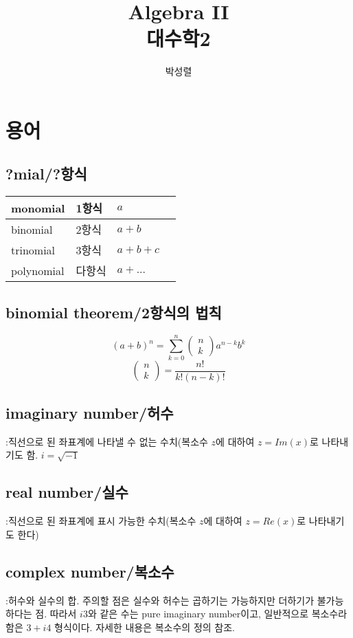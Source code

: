 \documentclass{article}
\title{Algebra II \\대수학2}
\author{박성렬}
\begin{document}
\maketitle

\section{용어}
\subsection{?mial/?항식}
\begin{tabular} {| l | l | l | l |}
\hline
monomial & 1항식 & $a$\\
\hline
binomial & 2항식 & $a+b$\\
\hline
trinomial & 3항식 & $a+b+c$\\
\hline
polynomial & 다항식 & $a+...$\\
\hline
\end{tabular}

\subsection{binomial theorem/2항식의 법칙}
$$(a+b)^{n}= \sum_{k=0}^{n} \begin{pmatrix}n \\ k \end{pmatrix} a^{n-k}b^{k}$$
$$\begin{pmatrix} n \\k \end{pmatrix}=\dfrac{n!}{k!(n-k)!} $$
\subsection{imaginary number/허수}
:직선으로 된 좌표계에 나타낼 수 없는 수치(복소수 $z$에 대하여 $z=Im(x)$로 나타내기도 함. $i=\sqrt{-1}$

\subsection{real number/실수}
:직선으로 된 좌표계에 표시 가능한 수치(복소수 $z$에 대하여 $z=Re(x)$로 나타내기도 한다)

\subsection{complex number/복소수}
:허수와 실수의 합. 주의할 점은 실수와 허수는 곱하기는 가능하지만 더하기가 불가능하다는 점. 따라서 $i3$와 같은 수는 pure imaginary number이고, 일반적으로 복소수라 함은 $3+i4$ 형식이다. 자세한 내용은 복소수의 정의 참조.
\end{document}
